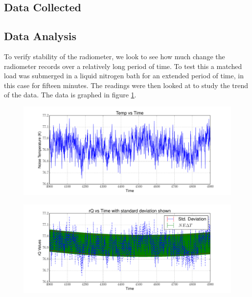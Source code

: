 {\subsection{Data Collected}

\subsection{Data Analysis}
To verify stability of the radiometer, we look to see how much change the radiometer records over a relatively long period of time.  To test this a matched load was submerged in a liquid nitrogen bath for an extended period of time, in this case for fifteen minutes.  The readings were then looked at to study the trend of the data.  The data is graphed in figure \ref{Stability}.

\begin{figure}[h!tb] \centering
\includegraphics[width=\textwidth]{Experiments/Exp2/sdr_calibrated_zoom.pdf}
\label{Stability}
\end{figure}

\begin{figure}[h!tb] \centering
\includegraphics[width=\textwidth]{Experiments/Exp2/calib_vstime_stddev.pdf}
\label{Stability_calib}
\end{figure}

}
